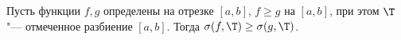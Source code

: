 
 	Пусть функции $f,g$ определены на отрезке $[a,b]$, $f\geq g$ на $[a,b]$, при этом $\T$ "--- отмеченное разбиение $[a,b]$. Тогда
 	$\sigma(f,\T)\geq\sigma(g,\T)$.
 